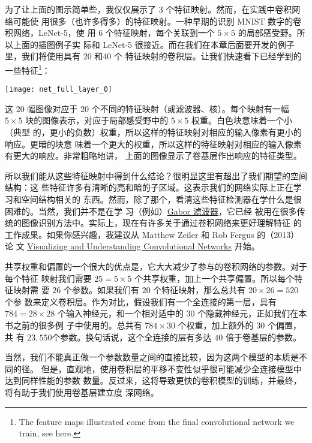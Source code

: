 为了让上面的图示简单些，我仅仅展示了 $3$ 个特征映射。然而，在实践中卷积网络可能使
用很多（也许多得多）的特征映射。一种早期的识别 MNIST 数字的卷积网络，LeNet-5，使
用 $6$ 个特征映射，每个关联到一个 $5 \times 5$ 的局部感受野。所以上面的插图例子实
际和 LeNet-5 很接近。而在我们在本章后面要开发的例子里，我们将使用具有 20 和40 个
特征映射的卷积层。让我们快速看下已经学到的一些特征\footnote{The feature maps
  illustrated come from the final convolutional network we train, see here.}：
\begin{center}
  \texttt{[image: net\_full\_layer\_0]}
\end{center}

这 20 幅图像对应于 20 个不同的特征映射（或滤波器、核）。每个映射有一幅 $5 \times
5$ 块的图像表示，对应于局部感受野中的 $5 \times 5$ 权重。白色块意味着一个小（典型
的，更小的负数）权重，所以这样的特征映射对相应的输入像素有更小的响应。更暗的块意
味着一个更大的权重，所以这样的特征映射对相应的输入像素有更大的响应。非常粗略地讲，
上面的图像显示了卷基层作出响应的特征类型。

所以我们能从这些特征映射中得到什么结论？很明显这里有超出了我们期望的空间结构：这
些特征许多有清晰的亮和暗的子区域。这表示我们的网络实际上正在学习和空间结构相关的
东西。然而，除了那个，看清这些特征检测器在学什么是很困难的。当然，我们并不是在学
习（例如）\href{http://en.wikipedia.org/wiki/Gabor_filter}{Gabor 滤波器}，它已经
被用在很多传统的图像识别方法中。实际上，现在有许多关于通过卷积网络来更好理解特征
的工作成果。如果你感兴趣，我建议从 Matthew Zeiler 和 Rob Fergus 的（2013）论
文 \href{http://arxiv.org/abs/1311.2901}{Visualizing and Understanding
  Convolutional Networks} 开始。

共享权重和偏置的一个很大的优点是，它大大减少了参与的卷积网络的参数。对于每个特征
映射我们需要 $25 = 5 \times 5$ 个共享权重，加上一个共享偏置。所以每个特征映射需
要 $26$ 个参数。如果我们有 $20$ 个特征映射，那么总共有 $20 \times 26 = 520$ 个参
数来定义卷积层。作为对比，假设我们有一个全连接的第一层，具有 $784 = 28 \times
28$ 个输入神经元，和一个相对适中的 $30$ 个隐藏神经元，正如我们在本书之前的很多例
子中使用的。总共有 $784 \times 30$ 个权重，加上额外的 $30$ 个偏置，共
有 $23,550$个参数。换句话说，这个全连接的层有多达 $40$ 倍于卷基层的参数。

当然，我们不能真正做一个参数数量之间的直接比较，因为这两个模型的本质是不同的径。
但是，直观地，使用卷积层的平移不变性似乎很可能减少全连接模型中达到同样性能的参数
数量。反过来，这将导致更快的卷积模型的训练，并最终，将有助于我们使用卷基层建立度
深网络。

